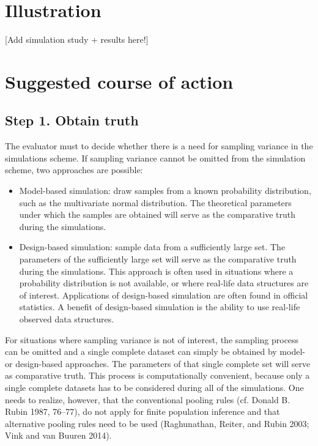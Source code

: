 \documentclass[
]{article}
\providecommand{\tightlist}{%
  \setlength{\itemsep}{0pt}\setlength{\parskip}{0pt}}
\begin{document}
\hypertarget{illustration}{%
\section{Illustration}\label{illustration}}

{[}Add simulation study + results here!{]}

\hypertarget{suggested-course-of-action}{%
\section{Suggested course of action}\label{suggested-course-of-action}}

\hypertarget{step-1.-obtain-truth}{%
\subsection{Step 1. Obtain truth}\label{step-1.-obtain-truth}}

The evaluator must to decide whether there is a need for sampling
variance in the simulations scheme. If sampling variance cannot be
omitted from the simulation scheme, two approaches are possible:

\begin{itemize}
\tightlist
\item
  Model-based simulation: draw samples from a known probability
  distribution, such as the multivariate normal distribution. The
  theoretical parameters under which the samples are obtained will serve
  as the comparative truth during the simulations.
\item
  Design-based simulation: sample data from a sufficiently large set.
  The parameters of the sufficiently large set will serve as the
  comparative truth during the simulations. This approach is often used
  in situations where a probability distribution is not available, or
  where real-life data structures are of interest. Applications of
  design-based simulation are often found in official statistics. A
  benefit of design-based simulation is the ability to use real-life
  observed data structures.
\end{itemize}

For situations where sampling variance is not of interest, the sampling
process can be omitted and a single complete dataset can simply be
obtained by model- or design-based approaches. The parameters of that
single complete set will serve as comparative truth. This process is
computationally convenient, because only a single complete datasets has
to be considered during all of the simulations. One needs to realize,
however, that the conventional pooling rules (cf. Donald B. Rubin 1987,
76--77), do not apply for finite population inference and that
alternative pooling rules need to be used (Raghunathan, Reiter, and
Rubin 2003; Vink and van Buuren 2014).
\end{document}
